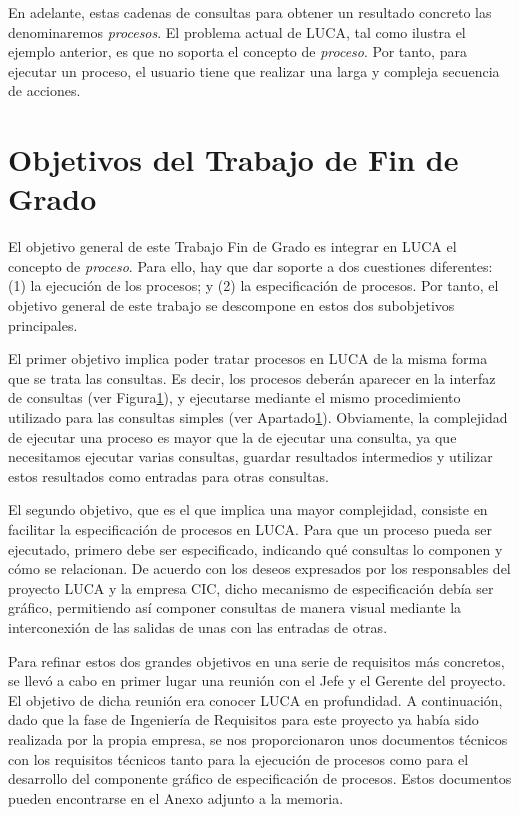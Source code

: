 En adelante, estas cadenas de consultas para obtener un resultado concreto las denominaremos \emph{procesos}. El problema actual de LUCA, tal como ilustra el ejemplo anterior, es que no soporta el concepto de \emph{proceso}. Por tanto, para ejecutar un proceso,  el usuario tiene que realizar una larga y compleja secuencia de acciones.

\section{Objetivos del Trabajo de Fin de Grado}

El objetivo general de este Trabajo Fin de Grado es integrar en LUCA el concepto de \emph{proceso}. Para ello, hay que dar soporte a dos cuestiones diferentes: (1) la ejecución de los procesos; y (2) la especificación de procesos. Por tanto, el objetivo general de este trabajo se descompone en estos dos subobjetivos principales. 

El primer objetivo implica poder tratar procesos en LUCA de la misma forma que se trata las consultas. Es decir, los procesos deberán aparecer en la interfaz de consultas (ver Figura\ref{}), y ejecutarse mediante el mismo procedimiento utilizado para las consultas simples (ver Apartado\ref{}). Obviamente, la complejidad de ejecutar una proceso es mayor que la de ejecutar una consulta, ya que necesitamos ejecutar varias consultas, guardar resultados intermedios y utilizar estos resultados como entradas para otras consultas.

El segundo objetivo, que es el que implica una mayor complejidad, consiste en facilitar la especificación de procesos en LUCA. Para que un proceso pueda ser ejecutado, primero debe ser especificado, indicando qué consultas lo componen y cómo se relacionan. De acuerdo con los deseos expresados por los responsables del proyecto LUCA y la empresa CIC, dicho mecanismo de especificación debía ser gráfico, permitiendo así componer consultas de manera visual mediante la interconexión de las salidas de unas con las entradas de otras.

Para refinar estos dos grandes objetivos en una serie de requisitos más concretos, se llevó a cabo en primer lugar una reunión con el Jefe y el Gerente del proyecto. El objetivo de dicha reunión era conocer LUCA en profundidad. A continuación, dado que la fase de Ingeniería de Requisitos para este proyecto ya había sido realizada por la propia empresa, se nos proporcionaron unos documentos técnicos con los requisitos técnicos tanto para la ejecución de procesos como para el desarrollo del componente gráfico de especificación de procesos. Estos documentos pueden encontrarse en el Anexo adjunto a la memoria.


